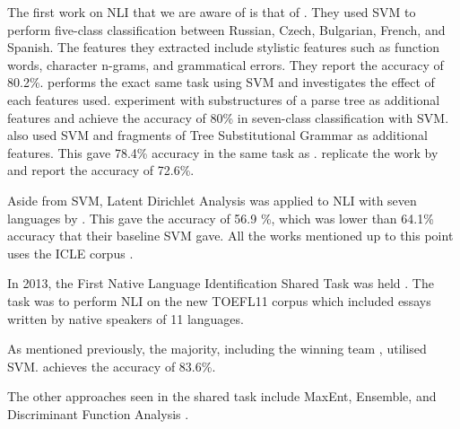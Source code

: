 The first work on NLI that we are aware of is that of \cite{koppel2005determining}.
They used SVM to perform five-class classification between Russian, Czech, Bulgarian, French, and Spanish.
The features they extracted include stylistic features such as function words, character n-grams, and grammatical errors.
They report the accuracy of 80.2\%.
\cite{tsur2007using} performs the exact same task using SVM and investigates the effect of each features used.
\cite{wong2011exploiting} experiment with substructures of a parse tree as additional features and achieve the accuracy of 80\% in seven-class classification with SVM.
\cite{swanson2012native} also used SVM and fragments of Tree Substitutional Grammar as additional features. This gave 78.4\% accuracy in the same task as \cite{wong2011exploiting}.
\cite{swanson2012native} replicate the work by \cite{wong2011exploiting} and report the accuracy of 72.6\%.

Aside from SVM, Latent Dirichlet Analysis was applied to NLI with seven languages by \cite{dras2011topic}.
This gave the accuracy of 56.9 \%, which was lower than 64.1\% accuracy that their baseline SVM gave.
All the works mentioned up to this point uses the ICLE corpus \citep{granger2002international}.

In 2013, the First Native Language Identification Shared Task was held \citep{tetreault2013report}.
The task was to perform NLI on the new TOEFL11 corpus \citep{tetreault2013report} which included essays written by native speakers of 11 languages.

As mentioned previously, the majority, including the winning team  \citep{jarvis2013maximizing}, utilised SVM.
\cite{jarvis2013maximizing} achieves the accuracy of 83.6\%.

The other approaches seen in the shared task include MaxEnt, Ensemble, and Discriminant Function Analysis \citep{tetreault2013report}.

